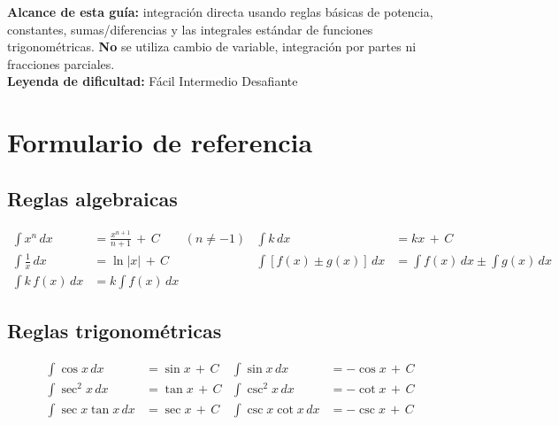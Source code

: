 \documentclass[12pt, letterpaper]{article}
\newcommand{\dx}{\,dx}
\newcommand{\C}{\,+\,C}
\begin{document}


\vspace{4pt}
\begin{cuadroinfo}
\small
\textbf{Alcance de esta guía:} integración directa usando reglas básicas de potencia,
constantes, sumas/diferencias y las integrales estándar de funciones trigonométricas.
\textbf{No} se utiliza cambio de variable, integración por partes ni fracciones parciales.\\[4pt]
\textbf{Leyenda de dificultad:}\quad
\facil{} Fácil\quad
\medio{} Intermedio\quad
\dificil{} Desafiante
\end{cuadroinfo}

\vspace{8pt}

\section{Formulario de referencia}

\subsection{Reglas algebraicas}

\begin{cuadroteoria}
\begin{align*}
  \int x^n \dx &= \frac{x^{n+1}}{n+1} \C \qquad (n \neq -1) &
  \int k \dx   &= kx \C \\[6pt]
  \int \frac{1}{x} \dx &= \ln|x| \C &
  \int \left[f(x) \pm g(x)\right] \dx &= \int f(x)\dx \pm \int g(x)\dx \\[6pt]
  \int k\,f(x) \dx &= k\int f(x)\dx
\end{align*}
\end{cuadroteoria}

\subsection{Reglas trigonométricas}

\begin{cuadroteoria}
\begin{align*}
  \int \cos x \dx  &= \sin x \C  &
  \int \sin x \dx  &= -\cos x \C \\[6pt]
  \int \sec^2 x \dx &= \tan x \C &
  \int \csc^2 x \dx &= -\cot x \C \\[6pt]
  \int \sec x\tan x \dx &= \sec x \C &
  \int \csc x\cot x \dx &= -\csc x \C
\end{align*}
\end{cuadroteoria}
\end{document}
